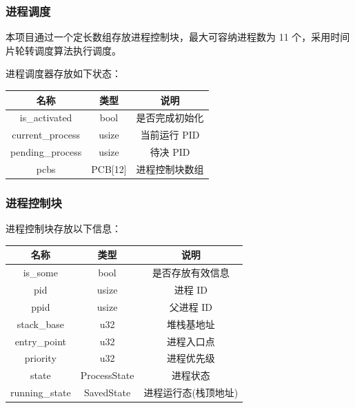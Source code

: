 \documentclass[aspectratio=169]{ctexbeamer}
\begin{document}
\begin{frame}

    \frametitle{进程调度}

    本项目通过一个定长数组存放进程控制块，最大可容纳进程数为 11 个，采用时间片轮转调度算法执行调度。

    \par

    进程调度器存放如下状态：

    \begin{center}
        \begin{tabular}{ |c|c|c| }
            \hline
            \textbf{名称} & \textbf{类型} & \textbf{说明} \\ \hline
            is\_activated & bool & 是否完成初始化 \\ 
            current\_process & usize & 当前运行 PID \\ 
            pending\_process & usize & 待决 PID \\ 
            pcbs & PCB[12] & 进程控制块数组 \\ \hline
        \end{tabular}
    \end{center}
    
\end{frame}

\begin{frame}
    \frametitle{进程控制块}

    进程控制块存放以下信息：

    \begin{center}
        \begin{tabular}{ |c|c|c| }
            \hline
            \textbf{名称} & \textbf{类型} & \textbf{说明} \\ \hline
            is\_some & bool & 是否存放有效信息 \\ 
            pid & usize & 进程 ID \\ 
            ppid & usize & 父进程 ID \\
            stack\_base & u32 & 堆栈基地址 \\
            entry\_point & u32 & 进程入口点 \\
            priority & u32 & 进程优先级 \\
            state & ProcessState & 进程状态 \\ 
            running\_state & SavedState & 进程运行态(栈顶地址) \\ \hline
        \end{tabular}
    \end{center}
\end{frame}
\end{document}
